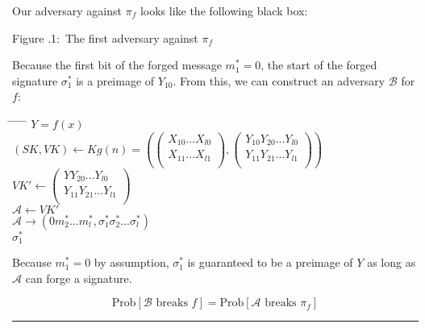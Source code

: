 \documentclass[twoside]{article}
\newcounter{lecnum}
\newcommand{\fig}[3]{
            \vspace{#2}
            \begin{center}
            Figure \thelecnum.#1:~#3
            \end{center}
    }
\newenvironment{proof}{{\bf Proof:}}{\hfill\rule{2mm}{2mm}}
\begin{document}
\begin{proof}
Our adversary against $\pi_f$ looks like the following black box:

\begin{center}
\end{center}
\fig{1}{0in}{The first adversary against $\pi_f$}

Because the first bit of the forged message $m^*_1 = 0$, the start of the forged signature $\sigma^*_1$ is a preimage of $Y_{10}$. From this, we can construct an adversary $\mathcal{B}$ for $f$:

\begin{tabbing}
\hspace*{.25in} \= \hspace*{.25in} \= \hspace*{.25in} \= \hspace*{.25in} \= \hspace*{.25in} \=\kill
{} $Y = f(x)$\\
\>$(SK, VK) \leftarrow Kg(n) = \left(
\begin{pmatrix}
X_{10}...X_{l0}\\
X_{11}...X_{l1}\\
\end{pmatrix},
\begin{pmatrix}
Y_{10}Y_{20}...Y_{l0}\\
Y_{11}Y_{21}...Y_{l1}\\
\end{pmatrix}\right)$\\
\>$VK' \leftarrow
\begin{pmatrix}
YY_{20}...Y_{l0}\\
Y_{11}Y_{21}...Y_{l1}\\
\end{pmatrix}$\\
\>$\mathcal{A} \leftarrow VK'$\\
\>$\mathcal{A} \rightarrow (0m^*_2...m^*_l,\sigma^*_1\sigma^*_2...\sigma^*_l)$\\
 $\sigma^*_1$
\end{tabbing}

Because $m^*_1 = 0$ by assumption, $\sigma^*_1$ is guaranteed to be a preimage of $Y$ as long as $\mathcal{A}$ can forge a signature.

$$\text{Prob}[\mathcal{B}\text{ breaks }f] = \text{Prob}[\mathcal{A}\text{ breaks }\pi_f]$$
\end{proof}
\end{document}
